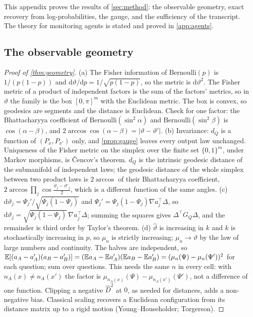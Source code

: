This appendix proves the results of \cref{sec:method}: the observable geometry, exact recovery from log-probabilities, the gauge, and the sufficiency of the transcript. The theory for monitoring agents is stated and proved in \cref{app:agents}.

\subsection{The observable geometry}
\begin{proof}[Proof of \cref{thm:geometry}]
(a) The Fisher information of $\mathrm{Bernoulli}(p)$ is $1/(p(1-p))$ and $\mathrm{d}\vartheta/\mathrm{d}p=1/\sqrt{p(1-p)}$, so the metric is $\mathrm{d}\vartheta^2$. The Fisher metric of a product of independent factors is the sum of the factors' metrics, so in $\vartheta$ the family is the box $[0,\pi]^m$ with the Euclidean metric. The box is convex, so geodesics are segments and the distance is Euclidean. Check for one factor: the Bhattacharyya coefficient of $\mathrm{Bernoulli}(\sin^2\alpha)$ and $\mathrm{Bernoulli}(\sin^2\beta)$ is $\cos(\alpha-\beta)$, and $2\arccos\cos(\alpha-\beta)=|\vartheta-\vartheta'|$.
(b) Invariance: $d_Q$ is a function of $(P_x,P_{x'})$ only, and \cref{prop:gauge} leaves every output law unchanged. Uniqueness of the Fisher metric on the simplex over the finite set $\{0,1\}^m$, under Markov morphisms, is \v{C}encov's theorem. $d_Q$ is the intrinsic geodesic distance of the submanifold of independent laws; the geodesic distance of the whole simplex between two product laws is $2\arccos$ of their Bhattacharyya coefficient, $2\arccos\prod_j\cos\frac{\vartheta_j-\vartheta'_j}{2}$, which is a different function of the same angles.
(c) $\mathrm{d}\vartheta_j=\Psi_j'/\sqrt{\Psi_j(1-\Psi_j)}$ and $\Psi_j'=\Psi_j(1-\Psi_j)\nabla a_j^{\top}\Delta$, so $\mathrm{d}\vartheta_j=\sqrt{\Psi_j(1-\Psi_j)}\,\nabla a_j^{\top}\Delta$; summing the squares gives $\Delta^{\top}G_Q\Delta$, and the remainder is third order by Taylor's theorem.
(d) $\hat\vartheta$ is increasing in $k$ and $k$ is stochastically increasing in $p$, so $\mu_n$ is strictly increasing; $\mu_n\to\vartheta$ by the law of large numbers and continuity. The halves are independent, so $\mathbb{E}[(a_A-a'_A)(a_B-a'_B)]=(\mathbb{E} a_A-\mathbb{E} a'_A)(\mathbb{E} a_B-\mathbb{E} a'_B)=(\mu_n(\Psi)-\mu_n(\Psi'))^2$ for each question; sum over questions. This needs the same $n$ in every cell: with $n_A(x)\ne n_A(x')$ the factor is $\mu_{n_A(x)}(\Psi)-\mu_{n_A(x')}(\Psi')$, not a difference of one function. Clipping a negative $\hat D^2$ at $0$, as needed for distances, adds a non-negative bias. Classical scaling recovers a Euclidean configuration from its distance matrix up to a rigid motion (Young--Householder; Torgerson).
\end{proof}

